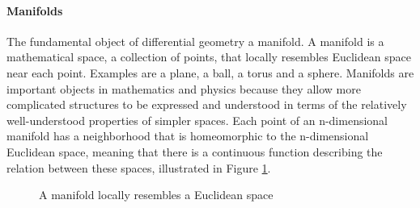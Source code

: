 
\paragraph{Manifolds}
The fundamental object of differential geometry a manifold. A manifold is a mathematical space, a collection of points, that locally resembles Euclidean space near each point. Examples are a plane, a ball, a torus and a sphere. Manifolds are important objects in mathematics and physics because they allow more complicated structures to be expressed and understood in terms of the relatively well-understood properties of simpler spaces. Each point of an n-dimensional manifold has a neighborhood that is homeomorphic to the n-dimensional Euclidean space, meaning that there is a continuous function describing the relation between these spaces, illustrated in Figure \ref{fig:mod.manifold}.
\begin{figure}[h!]
	\centering
	\caption{A manifold locally resembles a Euclidean space\label{fig:mod.manifold}}
\end{figure}

